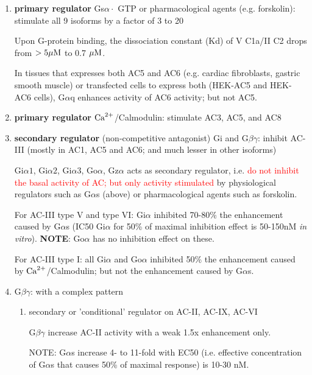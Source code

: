 \begin{enumerate}
  
  \item {\bf primary regulator} Gs$\alpha \cdot$ GTP or pharmacological agents
  (e.g.  forskolin):
  stimulate all 9 isoforms by a factor of 3 to 20
  
  Upon G-protein binding, the dissociation constant (Kd) of V C1a/II C2 drops
  from $> 5{\mu\text{M}}$ to 0.7 ${\mu\text{M}}$.

In tissues that expresses both AC5 and AC6 (e.g. cardiac fibroblasts, gastric
smooth muscle) or transfected cells to express both (HEK-AC5 and HEK-AC6 cells),
G$\alpha$q enhances activity of AC6 activity; but not AC5.

  \item {\bf primary regulator} ${\text{Ca}^{2+}}$/Calmodulin: stimulate AC3, AC5, and AC8
  
    
  \item {\bf secondary regulator} (non-competitive antagonist) Gi and
  G$\beta\gamma$: inhibit AC-III (mostly in AC1, AC5 and AC6; and much lesser in
  other isoforms)
  
Gi$\alpha1$, Gi$\alpha2$, Gi$\alpha3$, Go$\alpha$, Gz$\alpha$ acts as secondary
regulator, i.e. \textcolor{red}{do not inhibit the basal activity of AC; but
only activity stimulated} by physiological regulators such as G$\alpha$s (above)
or pharmacological agents such as forskolin.

For AC-III type V and type VI: Gi$\alpha$ inhibited 70-80\% the enhancement
caused by G$\alpha$s (IC50 Gi$\alpha$ for 50\% of maximal inhibition effect is
50-150nM {\it in vitro}).  {\bf NOTE}: Go$\alpha$ has no inhibition effect on
these.

For AC-III type I: all Gi$\alpha$ and Go$\alpha$ inhibited 50\% the enhancement
caused by ${\text{Ca}^{2+}}$/Calmodulin; but not the enhancement caused by G$\alpha$s.

  \item G$\beta\gamma$: with a complex pattern
  
  \begin{enumerate}
    \item secondary or 'conditional' regulator on AC-II, AC-IX,
    AC-VI 
    
G$\beta\gamma$ increase AC-II activity with a weak 1.5x enhancement only.
 
 NOTE: G$\alpha$s increase 4- to 11-fold with EC50 (i.e. effective
 concentration of G$\alpha$s that causes 50\% of maximal response) is 10-30 nM.


\end{enumerate}
\end{enumerate}

